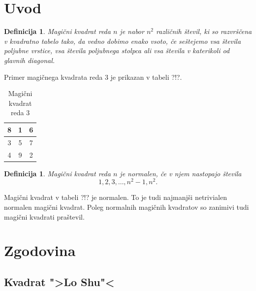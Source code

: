 \documentclass[a4paper,12pt]{article}
\newcommand{\pojem}[1]{\emph{\color{purple}#1}}
\newtheorem{definicija}[izrek]{Definicija}
\begin{document}
\section{Uvod}

\begin{definicija}
   \pojem{Magični kvadrat} reda $n$ je nabor $n^2$ različnih števil,
   ki so razvrščena v kvadratno tabelo tako, da vedno dobimo enako vsoto,
   če seštejemo vsa števila poljubne vrstice, vsa števila poljubnega
   stolpca ali vsa števila v katerikoli od glavnih diagonal.
\end{definicija}

Primer magičnega kvadrata reda 3 je prikazan v tabeli ?!?.

\begin{table}
   \centering
   \begin{tabular}{|c|c|c|}\hline
      8 & 1 & 6 \\\hline
      3 & 5 & 7 \\\hline
      4 & 9 & 2 \\\hline
   \end{tabular}
   \caption{Magični kvadrat reda 3}
   \label{table:mag3}
\end{table}

\begin{definicija}
   Magični kvadrat reda $n$ je \pojem{normalen}, če v njem nastopajo števila
   \begin{equation}
      \label{eq:numbers}
      1, 2, 3, \ldots, n^2-1, n^2.
   \end{equation}
\end{definicija}

Magični kvadrat v tabeli ?!? je normalen.
To je tudi najmanjši netrivialen normalen magični kvadrat.
Poleg normalnih magičnih kvadratov so zanimivi tudi magični kvadrati praštevil.


\section{Zgodovina}

\subsection{Kvadrat ">Lo Shu"<}
\end{document}
